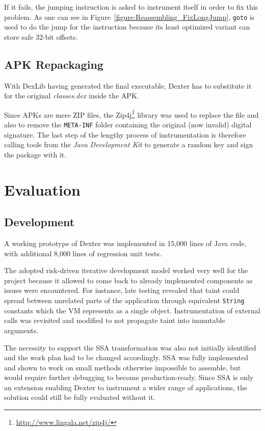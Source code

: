 \documentclass[12pt,twoside,notitlepage]{report}
\newcommand{\weblink}[1] {\footnote{\scriptsize\url{#1}}}
\begin{document}
If it fails, the jumping instruction is asked to instrument itself in order to fix this problem. As one can see in Figure~\ref{figure:Reassembling_FixLongJump}, \verb$goto$ is used to do the jump for the instruction because its least optimized variant can store safe 32-bit offsets.

\section{APK Repackaging}

With DexLib having generated the final executable, Dexter has to substitute it for the original \emph{classes.dex} inside the APK. 

Since APKs are mere ZIP files, the Zip4j\weblink{http://www.lingala.net/zip4j/} library was used to replace the file and also to remove the \verb$META-INF$ folder containing the original (now invalid) digital signature. The last step of the lengthy process of instrumentation is therefore calling tools from the \emph{Java Development Kit} to generate a random key and sign the package with it.

\cleardoublepage
\chapter{Evaluation}

\section{Development}

A working prototype of Dexter was implemented in 15,000 lines of Java code, with additional 8,000 lines of regression unit tests. 

The adopted risk-driven iterative development model worked very well for the project because it allowed to come back to already implemented components as issues were encountered. For instance, late testing revealed that taint could spread between unrelated parts of the application through equivalent \texttt{String} constants which the VM represents as a single object. Instrumentation of external calls was revisited and modified to not propagate taint into immutable arguments. 

The necessity to support the SSA transformation was also not initially identified and the work plan had to be changed accordingly. SSA was fully implemented and shown to work on small methods otherwise impossible to assemble, but would require further debugging to become production-ready. Since SSA is only an extension enabling Dexter to instrument a wider range of applications, the solution could still be fully evaluated without it.
\end{document}
